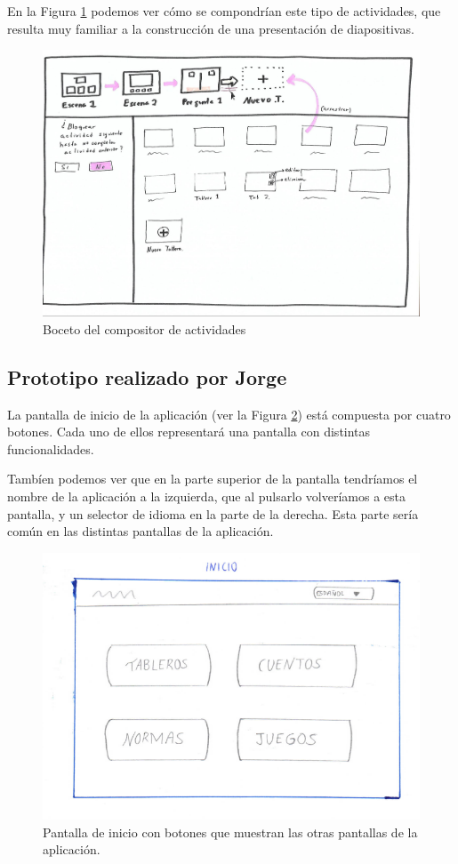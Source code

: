 En la Figura \ref{fig:presentaciontableros} podemos ver cómo se compondrían este tipo de actividades, que resulta muy familiar a la construcción de una presentación de diapositivas.  

\begin{figure}[h!]
	\centering
	\includegraphics[width=0.7\linewidth]{Imagenes/Bitmap/presentacionTableros}
	\caption{Boceto del compositor de actividades}
	\label{fig:presentaciontableros}
\end{figure}


\subsection{Prototipo realizado por Jorge}

	
	La pantalla de inicio de la aplicación (ver la Figura \ref{fig:iniciojorge}) está compuesta por cuatro botones. Cada uno de ellos representará una pantalla con distintas funcionalidades. 
	
	Tambíen podemos ver que en la parte superior de la pantalla tendríamos el nombre de la aplicación a la izquierda, que al pulsarlo volveríamos a esta pantalla, y un selector de idioma en la parte de la derecha. Esta parte sería común en las distintas pantallas de la aplicación.
	
	
\begin{figure}[h!]
	\centering
	\includegraphics[width=0.7\linewidth]{Imagenes/Bitmap/inicioJorge}
	\caption{Pantalla de inicio con botones que muestran las otras pantallas de la aplicación.}
	\label{fig:iniciojorge}
\end{figure}

